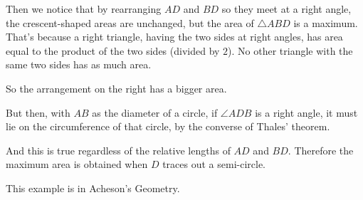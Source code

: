 \documentclass[11pt, oneside]{article}
\begin{document}
Then we notice that by rearranging $AD$ and $BD$ so they meet at a right angle, the crescent-shaped areas are unchanged, but the area of $\triangle ABD$ is a maximum.  That's because a right triangle, having the two sides at right angles, has area equal to the product of the two sides (divided by $2$).  No other triangle with the same two sides has as much area.

So the arrangement on the right has a bigger area.

But then, with $AB$ as the diameter of a circle, if $\angle ADB$ is a right angle, it must lie on the circumference of that circle, by the converse of Thales' theorem.

And this is true regardless of the relative lengths of $AD$ and $BD$.  Therefore the maximum area is obtained when $D$ traces out a semi-circle.

This example is in Acheson's Geometry.
\end{document}
